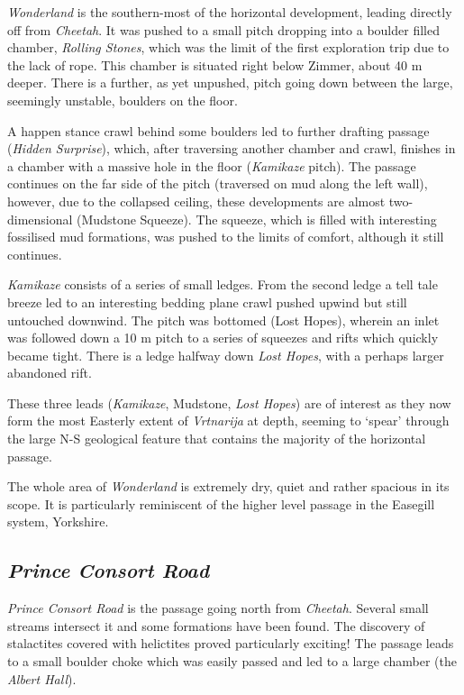 \emph{Wonderland} is the southern-most of the horizontal development,
leading directly off from \emph{Cheetah}. It was pushed to a small pitch
dropping into a boulder filled chamber, \emph{Rolling Stones}, which was
the limit of the first exploration trip due to the lack of rope. This
chamber is situated right below Zimmer, about 40 m deeper. There is a
further, as yet unpushed, pitch going down between the large, seemingly
unstable, boulders on the floor.

A happen stance crawl behind some boulders led to further drafting
passage (\emph{Hidden Surprise}), which, after traversing another
chamber and crawl, finishes in a chamber with a massive hole in the
floor (\emph{Kamikaze} pitch). The passage continues on the far side of
the pitch (traversed on mud along the left wall), however, due to the
collapsed ceiling, these developments are almost two-dimensional
(Mudstone Squeeze). The squeeze, which is filled with interesting
fossilised mud formations, was pushed to the limits of comfort, although
it still continues.

\emph{Kamikaze} consists of a series of small ledges. From the second
ledge a tell tale breeze led to an interesting bedding plane crawl
pushed upwind but still untouched downwind. The pitch was bottomed (Lost
Hopes), wherein an inlet was followed down a 10 m pitch to a series of
squeezes and rifts which quickly became tight. There is a ledge halfway
down \emph{Lost Hopes}, with a perhaps larger abandoned rift.

These three leads (\emph{Kamikaze}, Mudstone, \emph{Lost Hopes}) are of
interest as they now form the most Easterly extent of \emph{Vrtnarija}
at depth, seeming to `spear' through the large N-S geological feature
that contains the majority of the horizontal passage.

The whole area of \emph{Wonderland} is extremely dry, quiet and rather
spacious in its scope. It is particularly reminiscent of the higher
level passage in the Easegill system, Yorkshire.

\hypertarget{prince-consort-road}{%
\subsection{\texorpdfstring{\emph{Prince Consort
Road}}{Prince Consort Road}}\label{prince-consort-road}}

\emph{Prince Consort Road} is the passage going north from
\emph{Cheetah}. Several small streams intersect it and some formations
have been found. The discovery of stalactites covered with helictites
proved particularly exciting! The passage leads to a small boulder choke
which was easily passed and led to a large chamber (the \emph{Albert
Hall}).

